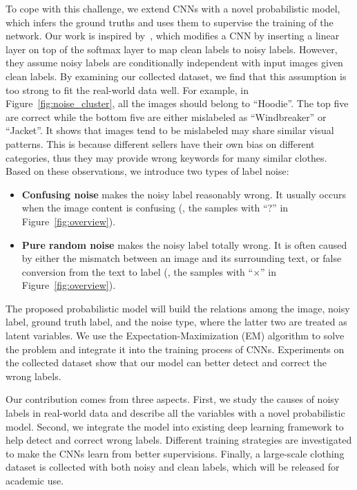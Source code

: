 \documentclass[10pt,twocolumn,letterpaper]{article}
\begin{document}
To cope with this challenge, we extend CNNs with a novel probabilistic model, which infers the ground truths and uses them to supervise the training of the network. Our work is inspired by~\cite{sukhbaatar2014learning}, which modifies a CNN by inserting a linear layer on top of the softmax layer to map clean labels to noisy labels. However, they assume noisy labels are conditionally independent with input images given clean labels. By examining our collected dataset, we find that this assumption is too strong to fit the real-world data well. For example, in Figure~\ref{fig:noise_cluster}, all the images should belong to ``Hoodie''. The top five are correct while the bottom five are either mislabeled as ``Windbreaker'' or ``Jacket''. It shows that images tend to be mislabeled may share similar visual patterns. This is because different sellers have their own bias on different categories, thus they may provide wrong keywords for many similar clothes. Based on these observations, we introduce two types of label noise:
\begin{itemize}
\item \textbf{Confusing noise} makes the noisy label reasonably wrong. It usually occurs when the image content is confusing (\eg, the samples with ``?'' in Figure~\ref{fig:overview}).
\item \textbf{Pure random noise} makes the noisy label totally wrong. It is often caused by either the mismatch between an image and its surrounding text, or false conversion from the text to label (\eg, the samples with ``$\times$'' in Figure~\ref{fig:overview}).
\end{itemize}

The proposed probabilistic model will build the relations among the image, noisy label, ground truth label, and the noise type, where the latter two are treated as latent variables. We use the Expectation-Maximization (EM) algorithm to solve the problem and integrate it into the training process of CNNs. Experiments on the collected dataset show that our model can better detect and correct the wrong labels.

Our contribution comes from three aspects. First, we study the causes of noisy labels in real-world data and describe all the variables with a novel probabilistic model. Second, we integrate the model into existing deep learning framework to help detect and correct wrong labels. Different training strategies are investigated to make the CNNs learn from better supervisions. Finally, a large-scale clothing dataset is collected with both noisy and clean labels, which will be released for academic use.
\end{document}
